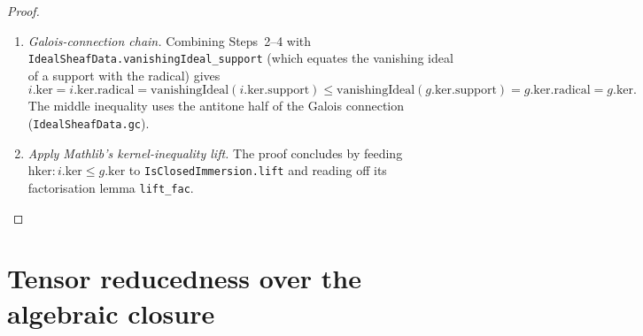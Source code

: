 \begin{proof}
\begin{enumerate}
  \item \emph{Galois-connection chain.} Combining Steps~2--4 with
    \texttt{IdealSheafData.vanishingIdeal\_support} (which equates
    the vanishing ideal of a support with the radical) gives
    \[
      i.\mathrm{ker}
        = i.\mathrm{ker}.\mathrm{radical}
        = \mathrm{vanishingIdeal}(i.\mathrm{ker}.\mathrm{support})
        \le \mathrm{vanishingIdeal}(g.\mathrm{ker}.\mathrm{support})
        = g.\mathrm{ker}.\mathrm{radical}
        = g.\mathrm{ker}.
    \]
    The middle inequality uses the antitone half of the Galois
    connection (\texttt{IdealSheafData.gc}).
  \item \emph{Apply Mathlib's kernel-inequality lift.} The proof
    concludes by feeding \(\mathrm{hker} : i.\mathrm{ker} \le g.\mathrm{ker}\)
    to \texttt{IsClosedImmersion.lift} and reading off its
    factorisation lemma \texttt{lift\_fac}.
  \end{enumerate}
\end{proof}

\section{Tensor reducedness over the algebraic closure}
\label{sec:tensor_AwayGm_isDomain}


